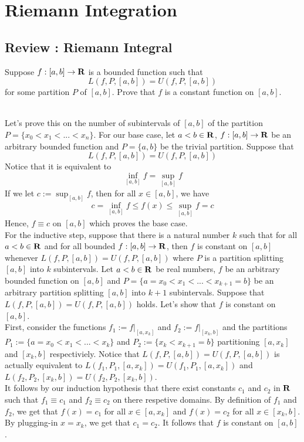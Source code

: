 \chapter{Riemann Integration}

\section{Review : Riemann Integral}

\begin{exercise}
    Suppose $f : [a,b] \to \mathbf{R}$ is a bounded function such that 
    $$L(f, P, [a,b]) = U(f, P, [a,b])$$
    for some partition $P$ of $[a,b]$. Prove that $f$ is a constant function on $[a,b]$. \\
\end{exercise}

\begin{solution}
    \\ Let's prove this on the number of subintervals of $[a,b]$ of the partition $P = \{x_0 < x_1 < ... < x_n\}$. For our base case, let $a < b \in \mathbf{R}$, $f : [a,b] \to \mathbf{R}$ be an arbitrary bounded function and $P = \{a, b\}$ be the trivial partition. Suppose that
    $$L(f, P, [a,b]) = U(f, P, [a,b])$$
    Notice that it is equivalent to
    $$\inf_{[a,b]}f = \sup_{[a,b]}f$$
    If we let $c := \sup_{[a,b]}f$, then for all $x \in [a,b]$, we have
    $$c = \inf_{[a,b]}f  \leq f(x) \leq \sup_{[a,b]}f  = c$$
    Hence, $f \equiv c$ on $[a,b]$ which proves the base case. \\
    For the inductive step, suppose that there is a natural number $k$ such that for all $a < b \in \mathbf{R}$ and for all bounded $f : [a,b] \to \mathbf{R}$, then $f$ is constant on $[a,b]$ whenever $L(f, P, [a,b]) = U(f, P, [a,b])$ where $P$ is a partition splitting $[a,b]$ into $k$ subintervals. Let $a < b \in \mathbf{R}$ be real numbers, $f$ be an arbitrary bounded function on $[a,b]$ and $P = \{a = x_0 < x_1 < ... < x_{k+1} = b\}$ be an arbitrary partition splitting $[a,b]$ into $k+1$ subintervals. Suppose that $L(f, P, [a,b]) = U(f, P, [a,b])$ holds. Let's show that $f$ is constant on $[a,b]$. \\ First, consider the functions $f_1 := f|_{[a, x_k]}$ and $f_2 := f|_{[x_k, b]}$ and the partitions $P_1 := \{a = x_0 < x_1 < ... < x_k\}$ and $P_2 := \{x_k < x_{k+1} = b\}$ partitioning $[a, x_k]$ and $[x_k, b]$ respectiviely. Notice that $L(f, P, [a,b]) = U(f, P, [a,b])$ is actually equivalent to $L(f_1, P_1, [a,x_k]) = U(f_1, P_1, [a,x_k])$ and $L(f_2, P_2, [x_k,b]) = U(f_2, P_2, [x_k,b])$. \\
    It follows by our induction hypothesis that there exist constants $c_1$ and $c_2$ in $\mathbf{R}$ such that $f_1 \equiv c_1$ and $f_2 \equiv c_2$ on there respetive domains. By definition of $f_1$ and $f_2$, we get that $f(x) = c_1$ for all $x \in [a, x_k]$ and $f(x) = c_2$ for all $x \in [x_k, b]$. By plugging-in $x = x_k$, we get that $c_1 = c_2$. It follows that $f$ is constant on $[a,b]$. \\
\end{solution}

